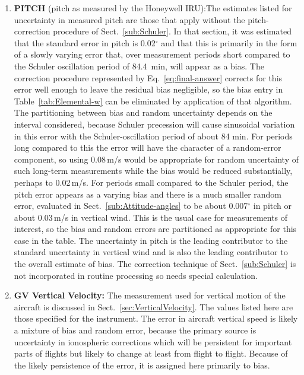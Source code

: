 \documentclass[12pt,twoside,english]{article}\usepackage[]{graphicx}\usepackage[]{color}
\let\OrgIndex\index
\renewcommand*{\index}[1]{\OrgIndex{#1}}
\begin{document}
{{\begin{enumerate}
\item \textbf{PITCH} (pitch as measured by the Honeywell IRU):The estimates listed for uncertainty in measured pitch are those that apply without the pitch-correction procedure of Sect.~\ref{sub:Schuler}. In that section, it was estimated that the standard error in pitch is 0.02$^{\circ}$ and that this is primarily in the form of a slowly varying error that, over measurement periods short compared to the Schuler oscillation period of 84.4~min, will appear as a bias. The correction procedure represented by Eq.~\ref{eq:final-answer} corrects for this error well enough to leave the residual bias negligible, so the bias entry in Table~\ref{tab:Elemental-w} can be eliminated by application of that algorithm. The partitioning between bias and random uncertainty depends on the interval considered, because Schuler precession will cause sinusoidal variation in this error with the Schuler-oscillation period of about 84 min. For periods long compared to this the error will have the character of a random-error component, so using 0.08\,m/s would be appropriate for random uncertainty of such long-term measurements while the bias would be reduced substantially, perhaps to 0.02\,m/s. For periods small compared to the Schuler period, the pitch error appears as a varying bias and there is a much smaller random error, evaluated in Sect.~\ref{sub:Attitude-angles} to be about 0.007$^{\circ}$ in pitch or about 0.03\,m/s in vertical wind. This is the usual case for measurements of interest, so the bias and random errors are partitioned as appropriate for this case in the table. The uncertainty in pitch is the leading contributor to the standard uncertainty in vertical wind and is also the leading contributor to the overall estimate of bias. The correction technique of Sect.~\ref{sub:Schuler} is not incorporated in routine processing so needs special calculation.  
\item \textbf{GV Vertical Velocity:} The measurement used for vertical motion of the aircraft is discussed in Sect.~\ref{sec:VerticalVelocity}. The values listed here are those specified for the instrument.
The error in aircraft vertical speed is likely a mixture of bias and random error, because the primary source is uncertainty in ionospheric corrections which will be persistent for important parts of flights but likely to change at least from flight to flight. Because of the likely persistence of the error, it is assigned here primarily to bias.  

\end{enumerate}}}
\end{document}
